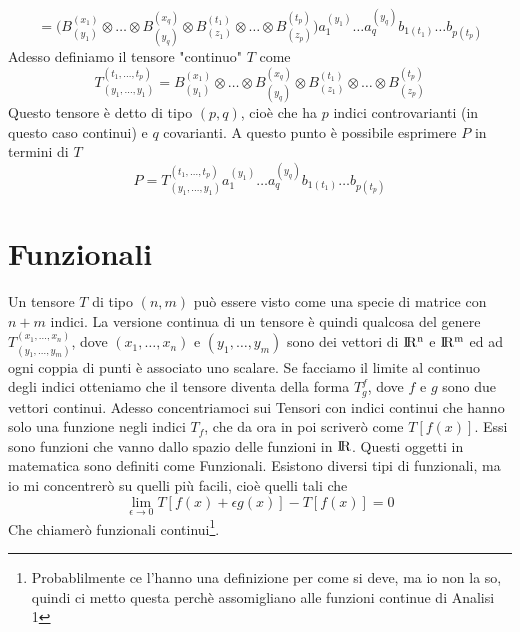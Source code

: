 \documentclass[11pt,a4paper]{article}
\theoremstyle{definition}
\theoremstyle{plain}
\theoremstyle{plain}
\begin{document}
		\[
			=\Big(B^{(x_1)}_{(y_1)}\otimes\dots\otimes B^{(x_q)}_{(y_q)}\otimes B_{(z_1)}^{(t_1)}\otimes\dots\otimes B_{(z_p)}^{(t_p)}\Big)a_1^{(y_1)}\dots a_q^{(y_q)}b_{1(t_1)}\dots b_{p(t_p)}
		\]
		Adesso definiamo il tensore "continuo" $T$ come
		\begin{equation}
			T_{(y_1,\dots,y_1)}^{(t_1,\dots,t_p)}=B^{(x_1)}_{(y_1)}\otimes\dots\otimes B^{(x_q)}_{(y_q)}\otimes B_{(z_1)}^{(t_1)}\otimes\dots\otimes B_{(z_p)}^{(t_p)}
		\end{equation}
		Questo tensore è detto di tipo $(p,q)$, cioè che ha $p$ indici controvarianti (in questo caso continui) e $q$ covarianti.\newline
		A questo punto è possibile esprimere $P$ in termini di $T$
		\begin{equation}
			P=T_{(y_1,\dots,y_1)}^{(t_1,\dots,t_p)}a_1^{(y_1)}\dots a_q^{(y_q)}b_{1(t_1)}\dots b_{p(t_p)}
		\end{equation}


	\section{Funzionali}
		Un tensore $T$ di tipo $(n,m)$ può essere visto come una specie di matrice con $n+m$ indici. La versione continua di un tensore è quindi qualcosa del genere $T^{(x_1,\dots,x_n)}_{(y_1,\dots,y_m)}$, dove $(x_1,\dots,x_n)$ e $(y_1,\dots,y_m)$ sono dei vettori di $\rm I\!R^n$ e $\rm I\!R^m$ ed ad ogni coppia di punti è associato uno scalare.\newline
		Se facciamo il limite al continuo degli indici otteniamo che il tensore diventa della forma $T^{f}_{g}$, dove $f$ e $g$ sono due vettori continui.\newline
		Adesso concentriamoci sui Tensori con indici continui che hanno solo una funzione negli indici $T_f$, che da ora in poi scriverò come $T[f(x)]$. Essi sono funzioni che vanno dallo spazio delle funzioni in $\rm I\!R$. Questi oggetti in matematica sono definiti come Funzionali.\newline
		Esistono diversi tipi di funzionali, ma io mi concentrerò su quelli più facili, cioè quelli tali che
		\begin{equation}
			\lim_{\epsilon 	\to 0}T[f(x)+\epsilon g(x)]-T[f(x)]=0
		\end{equation}
		Che chiamerò funzionali continui\footnote{Probablilmente ce l'hanno una definizione per come si deve, ma io non la so, quindi ci metto questa perchè assomigliano alle funzioni continue di Analisi 1}.
\end{document}
